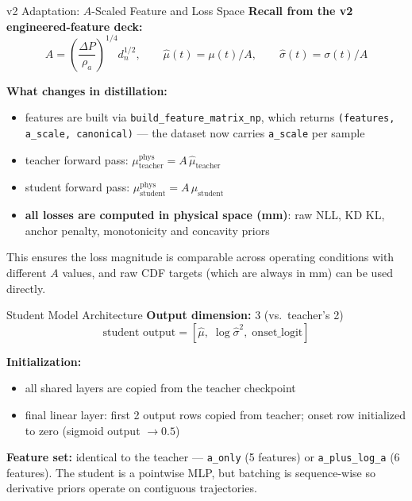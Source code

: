 \documentclass[UTF8,aspectratio=169]{ctexbeamer}
\begin{document}
\begin{frame}{v2 Adaptation: $A$-Scaled Feature and Loss Space}
\textbf{Recall from the v2 engineered-feature deck:}
\[
A = \left(\frac{\Delta P}{\rho_a}\right)^{1/4} d_n^{1/2}, \qquad
\hat\mu(t) = \mu(t)/A, \qquad
\hat\sigma(t) = \sigma(t)/A
\]

\vspace{0.3em}
\textbf{What changes in distillation:}
\begin{itemize}
  \item features are built via \texttt{build\_feature\_matrix\_np}, which returns \texttt{(features, a\_scale, canonical)} --- the dataset now carries \texttt{a\_scale} per sample
  \item teacher forward pass: $\mu_{\mathrm{teacher}}^{\mathrm{phys}} = A\,\hat\mu_{\mathrm{teacher}}$
  \item student forward pass: $\mu_{\mathrm{student}}^{\mathrm{phys}} = A\,\hat\mu_{\mathrm{student}}$
  \item \textbf{all losses are computed in physical space (mm)}: raw NLL, KD KL, anchor penalty, monotonicity and concavity priors
\end{itemize}

\vspace{0.3em}
This ensures the loss magnitude is comparable across operating conditions with different $A$ values, and raw CDF targets (which are always in mm) can be used directly.
\end{frame}

\begin{frame}{Student Model Architecture}
\textbf{Output dimension:} 3 (vs.\ teacher's 2)
\[
\text{student output} = [\hat\mu,\;\log\hat\sigma^2,\;\text{onset\_logit}]
\]

\textbf{Initialization:}
\begin{itemize}
  \item all shared layers are copied from the teacher checkpoint
  \item final linear layer: first 2 output rows copied from teacher; onset row initialized to zero (sigmoid output $\to 0.5$)
\end{itemize}

\vspace{0.3em}
\textbf{Feature set:} identical to the teacher --- \texttt{a\_only} (5 features) or \texttt{a\_plus\_log\_a} (6 features). The student is a pointwise MLP, but batching is sequence-wise so derivative priors operate on contiguous trajectories.
\end{frame}
\end{document}
